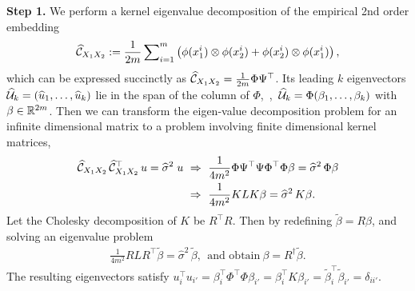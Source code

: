 \documentclass{article}
\begin{document}
{\bf Step 1.} We  perform a kernel eigenvalue decomposition of the empirical 2nd order embedding
$$
  \widehat {\mathcal{C}}_{X_1 X_2}:= \frac{1}{2m} \sum\nolimits_{i=1}^{m} \left(\phi(x_1^i) \otimes \phi(x_2^i) + \phi(x_2^i) \otimes \phi(x_1^i)\right),
$$
which can be expressed succinctly as $\widehat {\mathcal{C}}_{X_1 X_2} = \frac{1}{2m} \Phi \Psi^\top$.
Its leading $k$ eigenvectors $\widehat {\mathcal{U}}_k = (\widehat u_1,\ldots,\widehat u_k)$  lie in the span of the column of  $\Phi$,~\ie,~$\widehat {\mathcal{U}}_k = \Phi (\beta_1,\ldots,\beta_k)$ with $\beta \in \mathbb{R}^{2m}$. Then we can transform the eigen-value decomposition problem for an infinite dimensional matrix to a problem involving finite dimensional kernel matrices,
\begin{align*}
	\widehat {\mathcal{C}}_{X_1 X_2}\, \widehat {\mathcal{C}}_{X_1 X_2}^\top\, u = \widehat \sigma^2 \;u
	&~\Rightarrow~
	\frac{1}{4m^2}\Phi \Psi^\top \Psi \Phi^\top \Phi \beta = \widehat \sigma^2 \,\Phi \beta \\
	&~\Rightarrow~
	\frac{1}{4m^2} K L K \beta = \widehat \sigma^2 \,K \beta.
\end{align*}
Let the Cholesky decomposition of $K$ be $R^\top R$. Then by redefining $\widetilde{\beta}=R\beta$, and solving an eigenvalue problem
\begin{align}
 \frac{1}{4m^2} R L R^\top \widetilde{\beta} =\widehat  \sigma^2 \, \widetilde{\beta},~~\text{and obtain}~\beta = R^{\dagger} \widetilde{\beta}.
\end{align}
The resulting eigenvectors satisfy $u_i^\top u_{i'} = \beta_i^\top \Phi^\top \Phi \beta_{i'} =  \beta_{i}^\top K  \beta_{i'} =  \widetilde{\beta}_{i}^\top \widetilde{\beta}_{i'}=\delta_{ii'}$.
\end{document}
